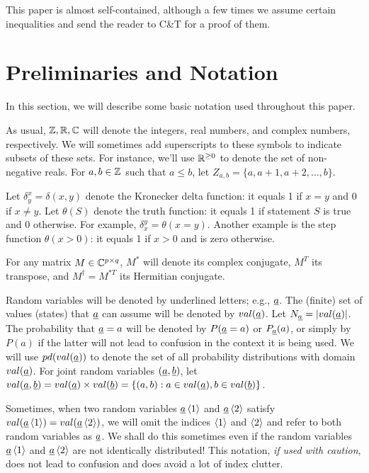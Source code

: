 This paper is almost self-contained,
although a few times we
assume
certain inequalities
and send the reader to C\&T for a proof
of them.

\section{Preliminaries and Notation}

In this section, we
will describe
some basic notation
used throughout this paper.


As usual, ${\mathbb{Z}},{ \mathbb{R}}, { \mathbb{C}}$
will denote the integers, real numbers,
and complex numbers, respectively.
We will sometimes
add superscripts to these
symbols to indicate subsets of
these sets. For instance,
we'll use ${ \mathbb{R}}^{\geq 0}$
to denote the set of non-negative reals.
For $a,b\in{\mathbb{Z}}$ such that $a\leq b$,
let
 $Z_{a,b}=\{a,a+1,a+2,\ldots, b\}$.

 Let
$\delta^x_{y}=\delta(x,y)$
denote the Kronecker delta function:
it equals 1 if $x=y$ and 0 if $x\neq y$.
Let $\theta(S)$ denote the truth function:
it equals 1 if statement
$S$ is true and 0 otherwise.
For example, $\delta_x^y = \theta(x=y)$.
Another example is the step function $\theta(x>0)$:
it equals 1 if $x>0$ and is zero otherwise.

For any matrix $M\in { \mathbb{C}}^{p\times q}$,
$M^*$ will denote its complex conjugate,
$M^T$ its transpose, and $M^\dagger = M^{*T}$
its Hermitian conjugate.

Random variables will be denoted
by underlined letters; e.g.,
$\rva$.
The (finite) set of values (states) that
$\rva$ can assume will be denoted
by $val(\rva)$. Let $N_\rva=|val(\rva)|$.
The probability that
$\rva=a$ will be denoted by $P(\rva=a)$
or $P_\rva(a)$, or simply by $P(a)$
if the latter will not lead to confusion
in the context it is being used.
We will use $pd(val(\rva))$ to denote
the set of all probability distributions
with domain $val(\rva)$. For joint random variables
$(\rva,\rvb)$, let
$val(\rva,\rvb) =
val(\rva)\times val(\rvb)=
\{(a,b):a\in val(\rva), b\in val(\rvb)\}$.

Sometimes, when
two random variables $\rva\av{1}$ and
$\rva\av{2}$ satisfy
$val(\rva\av{1})=val(\rva\av{2})$,
we will omit the indices $\left\langle1\right\rangle$
and $\left\langle2\right\rangle$ and refer to both
random variables as $\rva$.
We shall do this sometimes
even if the
random variables $\rva\av{1}$
 and $\rva\av{2}$ are not identically distributed!
This notation, {\it if used with caution},
does not lead to confusion and
does avoid a lot of index clutter.

